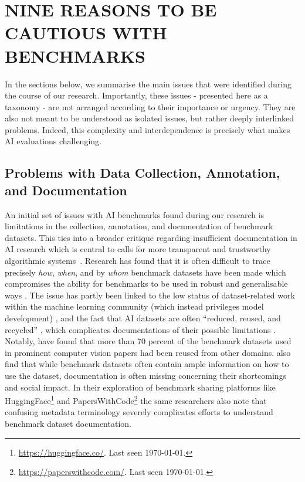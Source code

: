 \section{NINE REASONS TO BE CAUTIOUS WITH BENCHMARKS} 

In the sections below, we summarise the main issues that were identified during the course of our research. Importantly, these issues - presented here as a taxonomy - are not arranged according to their importance or urgency. They are also not meant to be understood as isolated issues, but rather deeply interlinked problems. Indeed, this complexity and interdependence is precisely what makes AI evaluations challenging.



\subsection{Problems with Data Collection, Annotation, and Documentation}

An initial set of issues with AI benchmarks found during our research is limitations in the collection, annotation, and documentation of benchmark datasets. This ties into a broader critique regarding insufficient documentation in AI research which is central to calls for more transparent and trustworthy algorithmic systems~\cite{gebru2021, mitchell2019, orr2024b, simson2024, scheuerman2021}. Research has found that it is often difficult to trace precisely \textit{how}, \textit{when}, and by \textit{whom} benchmark datasets have been made \cite{reuel_betterbench_2024, denton2020} which compromises the ability for benchmarks to be used in robust and generalisable ways \cite{arzt2024}. The issue has partly been linked to the low status of dataset-related work within the machine learning community (which instead privileges model development) \cite{orr2024, sambasivan2021}, and the fact that AI datasets are often “reduced, reused, and recycled” \cite{koch2021}, which complicates documentations of their possible limitations \cite{thylstrup2022, park2022}. Notably, \citet{koch2021} have found that more than 70 percent of the benchmark datasets used in prominent computer vision papers had been reused from other domains.
\citet{park2022} also find that while benchmark datasets often contain ample information on how to use the dataset, documentation is often missing concerning their shortcomings and social impact. 
In their exploration of benchmark sharing platforms like HuggingFace\footnote{\url{https://huggingface.co/}. Last seen \today.} and PapersWithCode\footnote{\url{https://paperswithcode.com/}. Last seen \today.} the same researchers also note that confusing metadata terminology severely complicates efforts to understand benchmark dataset documentation. 

